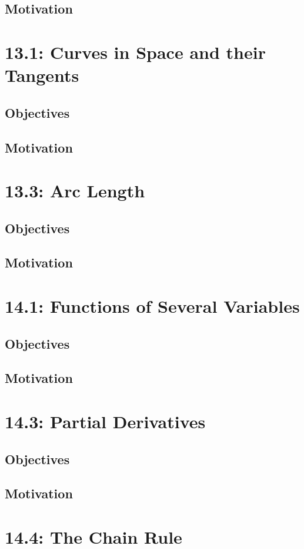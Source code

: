 \documentclass{report}
\begin{document}
\begin{sloppypar}
\section{Motivation}
\chapter{13.1: Curves in Space and their Tangents}
\section{Objectives}
\section{Motivation}
\chapter{13.3: Arc Length}
\section{Objectives}
\section{Motivation}
\chapter{14.1: Functions of Several Variables}
\section{Objectives}
\section{Motivation}
\chapter{14.3: Partial Derivatives}
\section{Objectives}
\section{Motivation}
\chapter{14.4: The Chain Rule}

\end{sloppypar}
\end{document}
